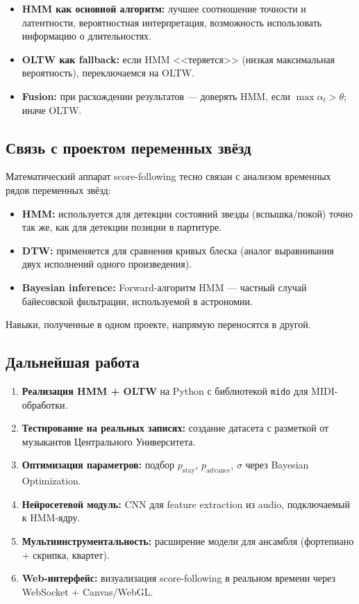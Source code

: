 \documentclass[a4paper,11pt]{article}
\begin{document}
\begin{itemize}[leftmargin=2em]
  \item \textbf{HMM как основной алгоритм:} лучшее соотношение
    точности и латентности, вероятностная интерпретация,
    возможность использовать информацию о длительностях.
  \item \textbf{OLTW как fallback:} если HMM <<теряется>>
    (низкая максимальная вероятность), переключаемся на OLTW.
  \item \textbf{Fusion:} при расхождении результатов --- доверять HMM,
    если $\max \alpha_t > \theta$; иначе OLTW.
\end{itemize}

\subsection{Связь с проектом переменных звёзд}

Математический аппарат score-following тесно связан с анализом
временных рядов переменных звёзд:

\begin{itemize}[leftmargin=2em]
  \item \textbf{HMM:} используется для детекции состояний звезды (вспышка/покой)
    точно так же, как для детекции позиции в партитуре.
  \item \textbf{DTW:} применяется для сравнения кривых блеска
    (аналог выравнивания двух исполнений одного произведения).
  \item \textbf{Bayesian inference:} Forward-алгоритм HMM ---
    частный случай байесовской фильтрации, используемой в астрономии.
\end{itemize}

Навыки, полученные в одном проекте, напрямую переносятся в другой.

\subsection{Дальнейшая работа}

\begin{enumerate}[leftmargin=2em]
  \item \textbf{Реализация HMM + OLTW} на Python с библиотекой \texttt{mido}
    для MIDI-обработки.
  \item \textbf{Тестирование на реальных записях:} создание датасета
    с разметкой от музыкантов Центрального Университета.
  \item \textbf{Оптимизация параметров:} подбор $p_{\text{stay}}$,
    $p_{\text{advance}}$, $\sigma$ через Bayesian Optimization.
  \item \textbf{Нейросетевой модуль:} CNN для feature extraction из audio,
    подключаемый к HMM-ядру.
  \item \textbf{Мультиинструментальность:} расширение модели для
    ансамбля (фортепиано + скрипка, квартет).
  \item \textbf{Web-интерфейс:} визуализация score-following в реальном
    времени через WebSocket + Canvas/WebGL.
\end{enumerate}
\end{document}
